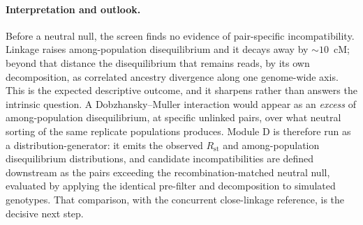 \documentclass[11pt]{article}
\newcommand{\Rst}{\ensuremath{R_{\mathrm{st}}}}
\begin{document}
\paragraph{Interpretation and outlook.}
Before a neutral null, the screen finds no evidence of pair-specific incompatibility.
Linkage raises among-population disequilibrium and it decays away by $\sim\!10$~cM;
beyond that distance the disequilibrium that remains reads, by its own
decomposition, as correlated ancestry divergence along one genome-wide axis. This
is the expected descriptive outcome, and it sharpens rather than answers the
intrinsic question. A Dobzhansky--Muller interaction would appear as an
\emph{excess} of among-population disequilibrium, at specific unlinked pairs, over
what neutral sorting of the same replicate populations produces. Module D is
therefore run as a distribution-generator: it emits the observed \Rst{} and
among-population disequilibrium distributions, and candidate incompatibilities are
defined downstream as the pairs exceeding the recombination-matched neutral null,
evaluated by applying the identical pre-filter and decomposition to simulated
genotypes. That comparison, with the concurrent close-linkage reference, is the
decisive next step.
\end{document}

